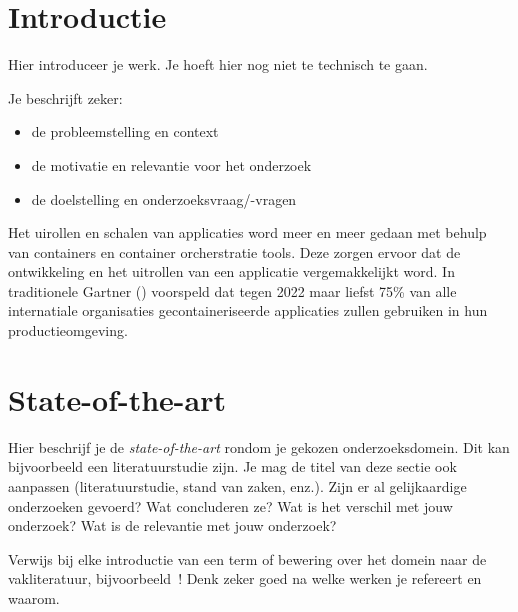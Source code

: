 
\section{Introductie} %
\label{sec:introductie}
Hier introduceer je werk. Je hoeft hier nog niet te technisch te gaan.

Je beschrijft zeker:

\begin{itemize}
  \item de probleemstelling en context
  \item de motivatie en relevantie voor het onderzoek
  \item de doelstelling en onderzoeksvraag/-vragen
\end{itemize}
Het uirollen en schalen van applicaties word meer en meer gedaan met behulp van containers en container orcherstratie tools.  
Deze zorgen ervoor dat de ontwikkeling en het uitrollen van een applicatie vergemakkelijkt word. In traditionele 
Gartner (\textcite{Gartner2019})  voorspeld dat tegen 2022 maar liefst 75\% van alle internatiale organisaties gecontaineriseerde applicaties zullen gebruiken in hun productieomgeving.



\section{State-of-the-art}
\label{sec:state-of-the-art}

Hier beschrijf je de \emph{state-of-the-art} rondom je gekozen onderzoeksdomein. Dit kan bijvoorbeeld een literatuurstudie zijn. Je mag de titel van deze sectie ook aanpassen (literatuurstudie, stand van zaken, enz.). Zijn er al gelijkaardige onderzoeken gevoerd? Wat concluderen ze? Wat is het verschil met jouw onderzoek? Wat is de relevantie met jouw onderzoek?

Verwijs bij elke introductie van een term of bewering over het domein naar de vakliteratuur, bijvoorbeeld~\autocite{kohgadai2020}! Denk zeker goed na welke werken je refereert en waarom.


